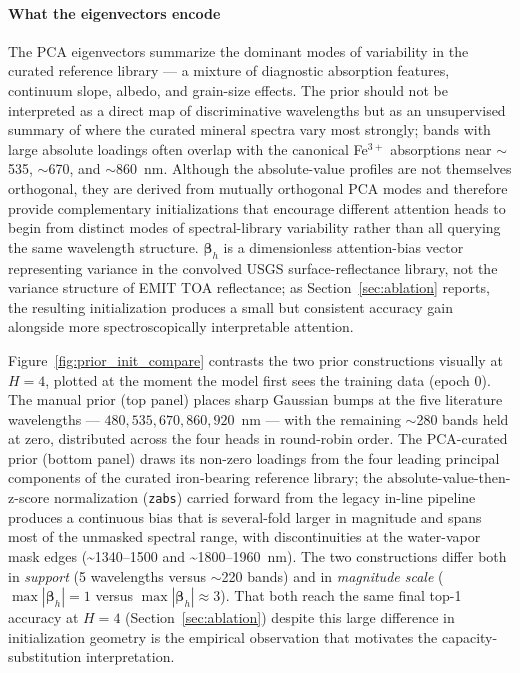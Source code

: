 \documentclass[preprint,12pt]{elsarticle}
\begin{document}
\paragraph{What the eigenvectors encode}
The PCA eigenvectors summarize the dominant modes of variability in the curated reference library --- a mixture of diagnostic absorption features, continuum slope, albedo, and grain-size effects. The prior should not be interpreted as a direct map of discriminative wavelengths but as an unsupervised summary of where the curated mineral spectra vary most strongly; bands with large absolute loadings often overlap with the canonical Fe$^{3+}$ absorptions near $\sim$535, $\sim$670, and $\sim$860~nm. Although the absolute-value profiles are not themselves orthogonal, they are derived from mutually orthogonal PCA modes and therefore provide complementary initializations that encourage different attention heads to begin from distinct modes of spectral-library variability rather than all querying the same wavelength structure. $\bm{\beta}_h$ is a dimensionless attention-bias vector representing variance in the convolved USGS surface-reflectance library, not the variance structure of EMIT TOA reflectance; as Section~\ref{sec:ablation} reports, the resulting initialization produces a small but consistent accuracy gain alongside more spectroscopically interpretable attention.

Figure~\ref{fig:prior_init_compare} contrasts the two prior constructions visually at $H = 4$, plotted at the moment the model first sees the training data (epoch 0).
The manual prior (top panel) places sharp Gaussian bumps at the five literature wavelengths --- $480, 535, 670, 860, 920$~nm --- with the remaining $\sim$280 bands held at zero, distributed across the four heads in round-robin order.
The PCA-curated prior (bottom panel) draws its non-zero loadings from the four leading principal components of the curated iron-bearing reference library; the absolute-value-then-z-score normalization (\texttt{zabs}) carried forward from the legacy in-line pipeline produces a continuous bias that is several-fold larger in magnitude and spans most of the unmasked spectral range, with discontinuities at the water-vapor mask edges (\textasciitilde{}1340--1500 and \textasciitilde{}1800--1960~nm).
The two constructions differ both in \emph{support} (5 wavelengths versus $\sim$220 bands) and in \emph{magnitude scale} ($\max|\bm{\beta}_h| = 1$ versus $\max|\bm{\beta}_h| \approx 3$).
That both reach the same final top-1 accuracy at $H = 4$ (Section~\ref{sec:ablation}) despite this large difference in initialization geometry is the empirical observation that motivates the capacity-substitution interpretation.
\end{document}
